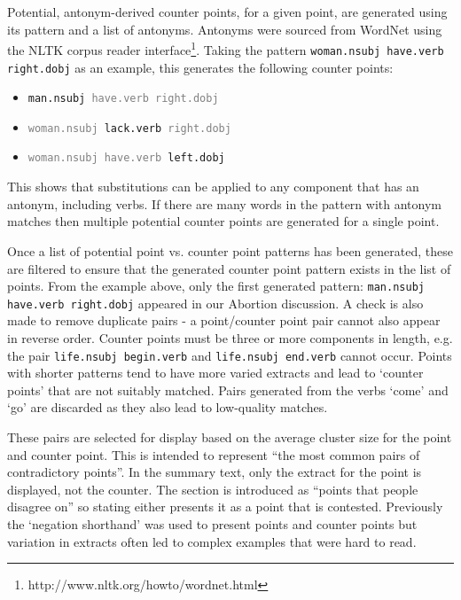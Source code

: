       Potential, antonym-derived counter points, for a given point, are generated using its pattern and a list of antonyms. Antonyms were sourced from WordNet \cite{miller1995wordnet} using the NLTK corpus reader interface\footnote{http://www.nltk.org/howto/wordnet.html}. Taking the pattern \texttt{woman.nsubj have.verb right.dobj} as an example, this generates the following counter points:

      \begin{itemize}[label={$\bullet$}]
        \item{\texttt{man.nsubj \textcolor{gray}{have.verb right.dobj}}}
        \item{\texttt{\textcolor{gray}{woman.nsubj} lack.verb \textcolor{gray}{right.dobj}}}
        \item{\texttt{\textcolor{gray}{woman.nsubj have.verb} left.dobj}}
      \end{itemize}

      This shows that substitutions can be applied to any component that has an antonym, including verbs. If there are many words in the pattern with antonym matches then multiple potential counter points are generated for a single point.

      Once a list of potential point vs. counter point patterns has been generated, these are filtered to ensure that the generated counter point pattern exists in the list of points. From the example above, only the first generated pattern: \texttt{man.nsubj have.verb right.dobj} appeared in our Abortion discussion. A check is also made to remove duplicate pairs - a point/counter point pair cannot also appear in reverse order. Counter points must be three or more components in length, e.g. the pair \texttt{life.nsubj begin.verb} and \texttt{life.nsubj end.verb} cannot occur. Points with shorter patterns tend to have more varied extracts and lead to `counter points' that are not suitably matched. Pairs generated from the verbs `come' and `go' are discarded as they also lead to low-quality matches.

      These pairs are selected for display based on the average cluster size for the point and counter point. This is intended to represent ``the most common pairs of contradictory points''. In the summary text, only the extract for the point is displayed, not the counter. The section is introduced as ``points that people disagree on'' so stating either presents it as a point that is contested. Previously the `negation shorthand' was used to present points and counter points but variation in extracts often led to complex examples that were hard to read.

